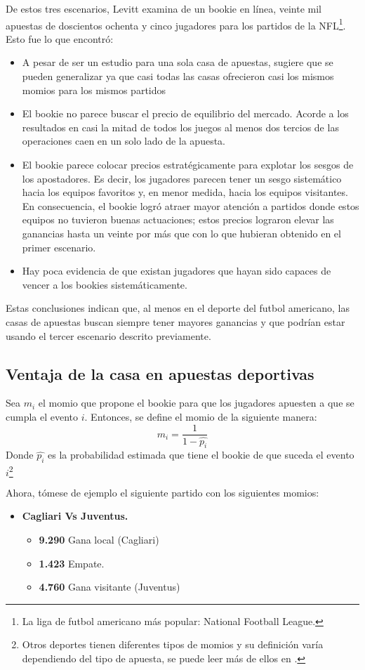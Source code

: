 De estos tres escenarios, Levitt \cite{levitt2004gambling} examina de un bookie en línea, veinte mil apuestas de doscientos ochenta y cinco jugadores para los partidos de la NFL\footnote{La liga de futbol americano más popular: National Football League.}. Esto fue lo que encontró:
\begin{itemize}
	\item A pesar de ser un estudio para una sola casa de apuestas, sugiere que se pueden generalizar ya que casi todas las casas ofrecieron casi los mismos momios para los mismos partidos
	\item El bookie no parece buscar el precio de equilibrio del mercado. Acorde a los resultados en casi la mitad de todos los juegos al menos dos tercios de las operaciones caen en un solo lado de la apuesta.
	\item El bookie parece colocar precios estratégicamente para explotar los sesgos de los apostadores. Es decir, los jugadores parecen tener un sesgo sistemático hacia los equipos favoritos y, en menor medida, hacia los equipos visitantes. En consecuencia, el bookie logró atraer mayor atención a partidos donde estos equipos no tuvieron buenas actuaciones; estos precios lograron elevar las ganancias hasta un veinte por más que con lo que hubieran obtenido en el primer escenario.
	\item Hay poca evidencia de que existan jugadores que hayan sido capaces de vencer a los bookies sistemáticamente.
 \end{itemize}
 
Estas conclusiones indican que, al menos en el deporte del futbol americano, las casas de apuestas buscan siempre tener mayores ganancias y que podrían estar usando el tercer escenario descrito previamente. 

 \subsection{Ventaja de la casa en apuestas deportivas}
Sea $m_i$ el momio que propone el bookie para que los jugadores apuesten a que se cumpla el evento $i$. Entonces, se define el momio de la siguiente manera:
\[m_i = \frac{1}{1 - \hat{p_i}}\]
Donde $\hat{p_i}$ es la probabilidad estimada que tiene el bookie de que suceda el evento $i$\footnote{Otros deportes tienen diferentes tipos de momios y su definición varía dependiendo del tipo de apuesta, se puede leer más de ellos en \cite{ignatin1984sports}.}

Ahora, tómese de ejemplo el siguiente partido con los siguientes momios:
\begin{itemize}

\item \textbf{Cagliari Vs Juventus.}
	\begin{itemize}
		\item \textbf{9.290} Gana local (Cagliari)
		\item \textbf{1.423} Empate.
		\item \textbf{4.760} Gana visitante (Juventus)
	\end{itemize}
\end{itemize}

